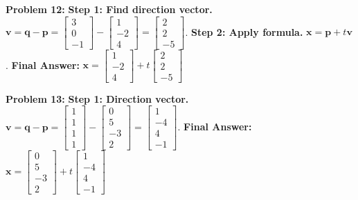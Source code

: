 \documentclass[12pt]{article}
\begin{document}
\textbf{Problem 12:}
\textbf{Step 1: Find direction vector.} $\mathbf{v} = \mathbf{q} - \mathbf{p} = \begin{bmatrix} 3 \\ 0 \\ -1 \end{bmatrix} - \begin{bmatrix} 1 \\ -2 \\ 4 \end{bmatrix} = \begin{bmatrix} 2 \\ 2 \\ -5 \end{bmatrix}$.
\textbf{Step 2: Apply formula.} $\mathbf{x} = \mathbf{p} + t\mathbf{v}$.
\textbf{Final Answer:} $\mathbf{x} = \begin{bmatrix} 1 \\ -2 \\ 4 \end{bmatrix} + t \begin{bmatrix} 2 \\ 2 \\ -5 \end{bmatrix}$

\textbf{Problem 13:}
\textbf{Step 1: Direction vector.} $\mathbf{v} = \mathbf{q} - \mathbf{p} = \begin{bmatrix} 1 \\ 1 \\ 1 \\ 1 \end{bmatrix} - \begin{bmatrix} 0 \\ 5 \\ -3 \\ 2 \end{bmatrix} = \begin{bmatrix} 1 \\ -4 \\ 4 \\ -1 \end{bmatrix}$.
\textbf{Final Answer:} $\mathbf{x} = \begin{bmatrix} 0 \\ 5 \\ -3 \\ 2 \end{bmatrix} + t \begin{bmatrix} 1 \\ -4 \\ 4 \\ -1 \end{bmatrix}$
\end{document}
